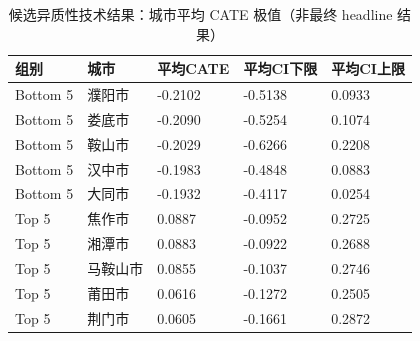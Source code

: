 \begin{table}
\caption{候选异质性技术结果：城市平均 CATE 极值（非最终 headline 结果）}
\label{tab:heterogeneity_candidate_extremes}
\begin{tabular}{lllll}
\toprule
组别 & 城市 & 平均CATE & 平均CI下限 & 平均CI上限 \\
\midrule
Bottom 5 & 濮阳市 & -0.2102 & -0.5138 & 0.0933 \\
Bottom 5 & 娄底市 & -0.2090 & -0.5254 & 0.1074 \\
Bottom 5 & 鞍山市 & -0.2029 & -0.6266 & 0.2208 \\
Bottom 5 & 汉中市 & -0.1983 & -0.4848 & 0.0883 \\
Bottom 5 & 大同市 & -0.1932 & -0.4117 & 0.0254 \\
Top 5 & 焦作市 & 0.0887 & -0.0952 & 0.2725 \\
Top 5 & 湘潭市 & 0.0883 & -0.0922 & 0.2688 \\
Top 5 & 马鞍山市 & 0.0855 & -0.1037 & 0.2746 \\
Top 5 & 莆田市 & 0.0616 & -0.1272 & 0.2505 \\
Top 5 & 荆门市 & 0.0605 & -0.1661 & 0.2872 \\
\bottomrule
\end{tabular}
\end{table}
